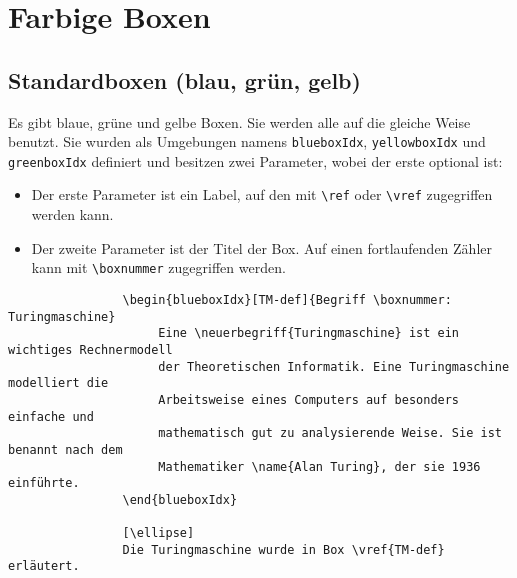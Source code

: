 	\chapter{Farbige Boxen}
		\section{Standardboxen (blau, grün, gelb)}
			Es gibt blaue, grüne und gelbe Boxen. Sie werden alle auf die gleiche Weise benutzt. Sie wurden als Umgebungen namens \verb|blueboxIdx|, \verb|yellowboxIdx| und \verb|greenboxIdx| definiert und besitzen zwei Parameter, wobei der erste optional ist:
			\begin{itemize}
				\item Der erste Parameter ist ein Label, auf den mit \verb|\ref| oder \verb|\vref| zugegriffen werden kann.
				\item Der zweite Parameter ist der Titel der Box. Auf einen fortlaufenden Zähler kann mit \verb|\boxnummer| zugegriffen werden.
			\end{itemize}
			
			\begin{verbatim}
				\begin{blueboxIdx}[TM-def]{Begriff \boxnummer: Turingmaschine}
				     Eine \neuerbegriff{Turingmaschine} ist ein wichtiges Rechnermodell
				     der Theoretischen Informatik. Eine Turingmaschine modelliert die
				     Arbeitsweise eines Computers auf besonders einfache und
				     mathematisch gut zu analysierende Weise. Sie ist benannt nach dem
				     Mathematiker \name{Alan Turing}, der sie 1936 einführte.
				\end{blueboxIdx}

				[\ellipse]
				Die Turingmaschine wurde in Box \vref{TM-def} erläutert.
			\end{verbatim}
			
		\newpage
